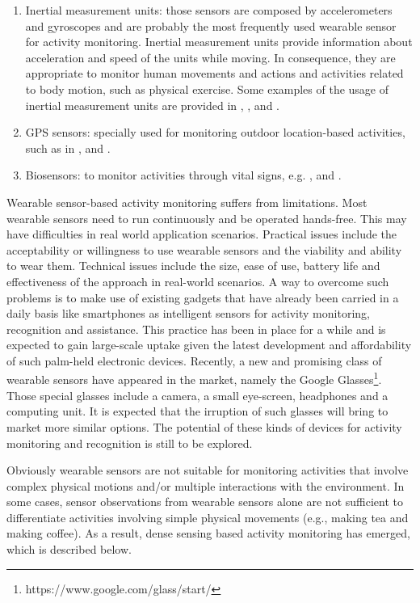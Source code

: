 \begin{enumerate}
 \item Inertial measurement units: those sensors are composed by accelerometers and gyroscopes and are probably the most frequently used wearable sensor for activity monitoring. Inertial measurement units provide information about acceleration and speed of the units while moving. In consequence, they are appropriate to monitor human movements and actions and activities related to body motion, such as physical exercise. Some  examples of the usage of inertial measurement units are provided in \cite{Bao2004}, \cite{Lukowicz2004}, \cite{Lee2002} and \cite{Mantyjarvi2001}.
 \item GPS sensors: specially used for monitoring outdoor location-based activities, such as in \cite{Patterson2003}, \cite{Ashbrook2003} and \cite{Liao2007a}.
 \item Biosensors: to monitor activities through vital signs, e.g. \cite{Sung2004}, \cite{Harms2008} and \cite{Finni2007}.
\end{enumerate}

Wearable sensor-based activity monitoring suffers from limitations. Most wearable sensors need to run continuously and be operated hands-free. This may have difficulties in real world application scenarios. Practical issues include the acceptability or willingness to use wearable sensors and the viability and ability to wear them. Technical issues include the size, ease of use, battery life and effectiveness of the approach in real-world scenarios. A way to overcome such problems is to make use of existing gadgets that have already been carried in a daily basis like smartphones as intelligent sensors for activity monitoring, recognition and assistance. This practice has been in place for a while \cite{Gellersen2002} \cite{Schmidt2001} and is expected to gain large-scale uptake given the latest development and affordability of such palm-held electronic devices. Recently, a new and promising class of wearable sensors have appeared in the market, namely the Google Glasses\footnote{https://www.google.com/glass/start/}. Those special glasses include a camera, a small eye-screen, headphones and a computing unit. It is expected that the irruption of such glasses will bring to market more similar options. The potential of these kinds of devices for activity monitoring and recognition is still to be explored. 

Obviously wearable sensors are not suitable for monitoring activities that involve complex physical motions and/or multiple interactions with the environment. In some cases, sensor observations from wearable sensors alone are not sufficient to differentiate activities involving simple physical movements (e.g., making tea and making coffee). As a result, dense sensing based activity monitoring has emerged, which is described below.

